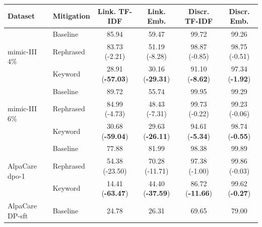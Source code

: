 \begin{table}[h]
\centering
\small
\begin{tabular}{llcccc}
\toprule
\textbf{Dataset} & \textbf{Mitigation} & \textbf{Link. TF-IDF} & \textbf{Link. Emb.} & \textbf{Discr. TF-IDF} & \textbf{Discr. Emb.} \\
\midrule
\multirow{3}{*}{\gls{mimic}-III 4\%} & Baseline & 85.94 & 59.47 & 99.72 & 99.26 \\
 & Rephrased & 83.73 {\scriptsize(\textcolor{green!50!black}{-2.21})} & 51.19 {\scriptsize(\textcolor{green!50!black}{-8.28})} & 98.87 {\scriptsize(\textcolor{green!50!black}{-0.85})} & 98.75 {\scriptsize(\textcolor{green!50!black}{-0.51})} \\
 & Keyword & 28.91 {\scriptsize(\textbf{\textcolor{green!50!black}{-57.03}})} & 30.16 {\scriptsize(\textbf{\textcolor{green!50!black}{-29.31}})} & 91.10 {\scriptsize(\textbf{\textcolor{green!50!black}{-8.62}})} & 97.34 {\scriptsize(\textbf{\textcolor{green!50!black}{-1.92}})} \\
\midrule
\multirow{3}{*}{\gls{mimic}-III 6\%} & Baseline & 89.72 & 55.74 & 99.95 & 99.29 \\
 & Rephrased & 84.99 {\scriptsize(\textcolor{green!50!black}{-4.73})} & 48.43 {\scriptsize(\textcolor{green!50!black}{-7.31})} & 99.73 {\scriptsize(\textcolor{green!50!black}{-0.22})} & 99.23 {\scriptsize(\textcolor{green!50!black}{-0.06})} \\
 & Keyword & 30.68 {\scriptsize(\textbf{\textcolor{green!50!black}{-59.04}})} & 29.63 {\scriptsize(\textbf{\textcolor{green!50!black}{-26.11}})} & 94.61 {\scriptsize(\textbf{\textcolor{green!50!black}{-5.34}})} & 98.74 {\scriptsize(\textbf{\textcolor{green!50!black}{-0.55}})} \\
\midrule
\multirow{3}{*}{AlpaCare \gls{dpo}-1} & Baseline & 77.88 & 81.99 & 98.38 & 99.89 \\
 & Rephrased & 54.38 {\scriptsize(\textcolor{green!50!black}{-23.50})} & 70.28 {\scriptsize(\textcolor{green!50!black}{-11.71})} & 97.38 {\scriptsize(\textcolor{green!50!black}{-1.00})} & 99.86 {\scriptsize(\textcolor{green!50!black}{-0.03})} \\
 & Keyword & 14.41 {\scriptsize(\textbf{\textcolor{green!50!black}{-63.47}})} & 44.40 {\scriptsize(\textbf{\textcolor{green!50!black}{-37.59}})} & 86.72 {\scriptsize(\textbf{\textcolor{green!50!black}{-11.66}})} & 99.62 {\scriptsize(\textbf{\textcolor{green!50!black}{-0.27}})} \\
\midrule
\multirow{3}{*}{AlpaCare DP-\gls{sft}} & Baseline & 24.78 & 26.31 & 69.65 & 79.00 \\

\end{tabular}
\end{table}
